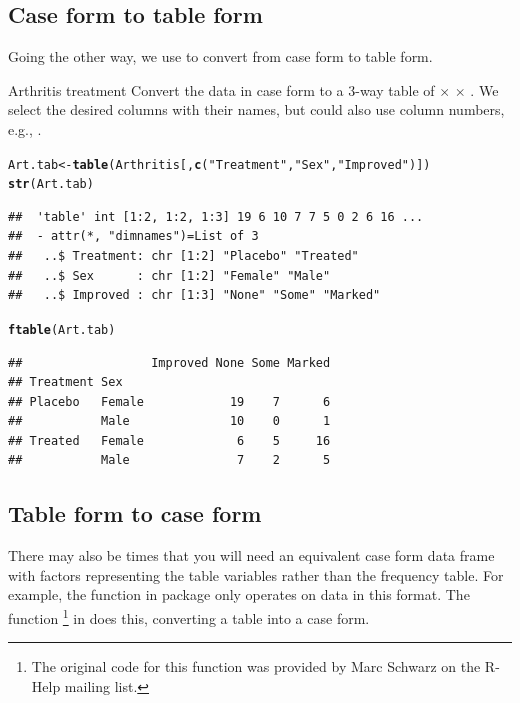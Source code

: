 \documentclass[11pt]{book}\usepackage[]{graphicx}\usepackage[]{color}
\makeatletter
\newcommand{\hlstr}[1]{\textcolor[rgb]{0.192,0.494,0.8}{#1}}%
\newcommand{\hlstd}[1]{\textcolor[rgb]{0.345,0.345,0.345}{#1}}%
\newcommand{\hlkwb}[1]{\textcolor[rgb]{0.69,0.353,0.396}{#1}}%
\newcommand{\hlkwd}[1]{\textcolor[rgb]{0.737,0.353,0.396}{\textbf{#1}}}%
\newenvironment{kframe}{%
 \def\at@end@of@kframe{}%
 \ifinner\ifhmode%
  \def\at@end@of@kframe{\end{minipage}}%
  \begin{minipage}{\columnwidth}%
 \fi\fi%
 \def\FrameCommand##1{\hskip\@totalleftmargin \hskip-\fboxsep
 \colorbox{shadecolor}{##1}\hskip-\fboxsep
     \hskip-\linewidth \hskip-\@totalleftmargin \hskip\columnwidth}%
 \MakeFramed {\advance\hsize-\width
   \@totalleftmargin\z@ \linewidth\hsize
   \@setminipage}}%
 {\par\unskip\endMakeFramed%
 \at@end@of@kframe}
\newenvironment{knitrout}{}{} %
\renewenvironment{knitrout}{\small\renewcommand{\baselinestretch}{.85}}{} %
\makeatother
\begin{document}
\subsection{Case form to table form}
Going the other way, we use  to convert from case form to table form.

\begin{Example}{Arthritis treatment}
Convert the  data in case form to a 3-way table of
 $\times$  $\times$ .
We select the desired columns with their names, but could also use column
numbers, e.g., .
\begin{knitrout}
\color{fgcolor}\begin{kframe}
\begin{alltt}
\hlstd{Art.tab} \hlkwb{<-} \hlkwd{table}\hlstd{(Arthritis[,}\hlkwd{c}\hlstd{(}\hlstr{"Treatment"}\hlstd{,} \hlstr{"Sex"}\hlstd{,} \hlstr{"Improved"}\hlstd{)])}
\hlkwd{str}\hlstd{(Art.tab)}
\end{alltt}
\begin{verbatim}
##  'table' int [1:2, 1:2, 1:3] 19 6 10 7 7 5 0 2 6 16 ...
##  - attr(*, "dimnames")=List of 3
##   ..$ Treatment: chr [1:2] "Placebo" "Treated"
##   ..$ Sex      : chr [1:2] "Female" "Male"
##   ..$ Improved : chr [1:3] "None" "Some" "Marked"
\end{verbatim}
\begin{alltt}
\hlkwd{ftable}\hlstd{(Art.tab)}
\end{alltt}
\begin{verbatim}
##                  Improved None Some Marked
## Treatment Sex                             
## Placebo   Female            19    7      6
##           Male              10    0      1
## Treated   Female             6    5     16
##           Male               7    2      5
\end{verbatim}
\end{kframe}
\end{knitrout}

\end{Example}

\subsection{Table form to case form}
There may also be times that you will need an equivalent case form data frame
with factors  representing the table variables
rather than the frequency  table.
For example, the  function in package 
only operates on data in this format. 
The function %
\footnote{
The original code for this function was provided by Marc Schwarz on the R-Help
mailing list.
}
in 
does this, converting a table into a case form.
\end{document}
